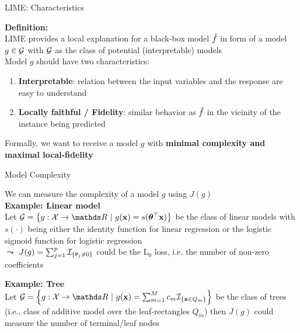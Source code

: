 \documentclass[11pt,compress,t,notes=noshow, aspectratio=169, xcolor=table]{beamer}
\begin{document}
\begin{frame}[c]{LIME: Characteristics}

    \textbf{Definition:}\\
	LIME provides a local explanation for a black-box model $\fh$ in form of a model $g \in \Gspace$ with $\Gspace$ as the class of potential (interpretable) models\\[2em]
	
	
	Model $g$ should have two characteristics:
	\begin{enumerate}
		\item \textbf{Interpretable}: relation between the input variables and the response are easy to understand  
		\item \textbf{Locally faithful / Fidelity}: similar behavior as $\fh$ in the vicinity of the instance being predicted
	\end{enumerate}
	
	\vspace{2em}
	Formally, we want to receive a model $g$ with \textbf{minimal complexity and maximal local-fidelity} 
\end{frame}


\begin{frame}[c]{Model Complexity}
    
    We can measure the complexity of a model $g$ using $J(g)$ \\[2em]

 	\textbf{Example: Linear model}\\
 	Let $\Gspace = \left\{g: \Xspace \to \R ~|~g(\xv) = s(\thetab^\top \xv)\right\}$ be the class of linear models with $s(\cdot)$ being either the identity function for linear regression or the logistic sigmoid function for logistic regression \\
 	$\leadsto$ $J(g) = \sum_{j = 1}^p \Ind_{\{ \theta_j \neq 0 \}}$ could be the L$_0$ loss, i.e. the number of non-zero coefficients 
 	\vspace{0.5cm}
 	
 	\textbf{Example: Tree}\\
 	Let $\Gspace = \left\{g:\Xspace \to \R ~|~g(\xv) = \sum_{m=1}^M c_m \Ind_{\{ \xv \in Q_m \}}\right\}$ be the class of trees (i.e., class of additive model over the leaf-rectangles $Q_m$) then $J(g)$ could measure the number of terminal/leaf nodes\\
 	
\end{frame}
 
\end{document}
